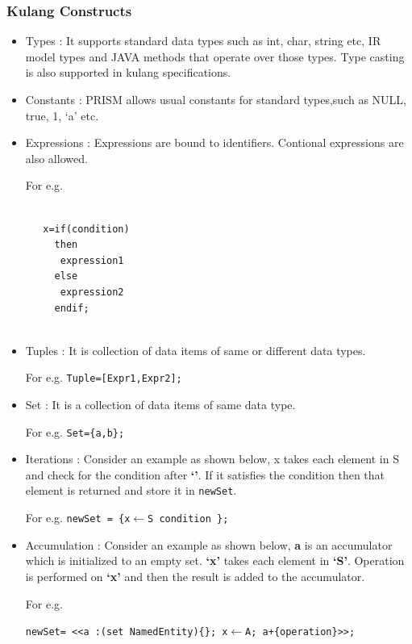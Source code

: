 \documentclass[11pt,a4paper,openright]{report}
\begin{document}
\subsubsection{Kulang Constructs}
\begin{itemize}
 \item Types : It supports standard data types such as int, char, string etc, IR model types and JAVA methods that operate over those types.
 Type casting is also supported in kulang specifications.
 
 \item Constants : PRISM allows usual constants for standard types,such as  NULL, true, 1, ‘a’ etc.
 \item Expressions : Expressions are bound to identifiers. Contional expressions are also allowed.
 
 For e.g.
 \begin{lstlisting}[]  % Start your code-block
   
   x=if(condition)
     then
	  expression1
     else
	  expression2
     endif;
 
\end{lstlisting}

\item Tuples : It is collection of data items of same or different data types.

For e.g.
 \hspace{15mm} \texttt{Tuple=[Expr1,Expr2];}
 
\item Set : It is a collection of data items of same data type.

For e.g.
 \hspace{15mm} \texttt{Set=\{a,b\};}				    

 \item Iterations : Consider an example as shown below, x takes each element in S and check for the condition after \textbf{`\textbar'}.
 If it satisfies the condition then that element is returned and store it in \texttt{newSet}. 
 
 For e.g.
 \hspace{15mm} \texttt{newSet = \{x$\leftarrow$S\hspace{1mm} \textbar \hspace{1mm} condition \};}
 
 \item Accumulation : Consider an example as shown below, \textbf{a} is an accumulator which is initialized to an empty set. \textbf{`x'}
 takes each element in \textbf{`S'}. Operation is performed on \textbf{`x'} and then the result is added to the accumulator.
 
 For e.g.
 
  \texttt{newSet= <<a :(set NamedEntity)\{\}; x$\leftarrow$A; a+\{operation\}>>;}
\end{itemize}
\end{document}
